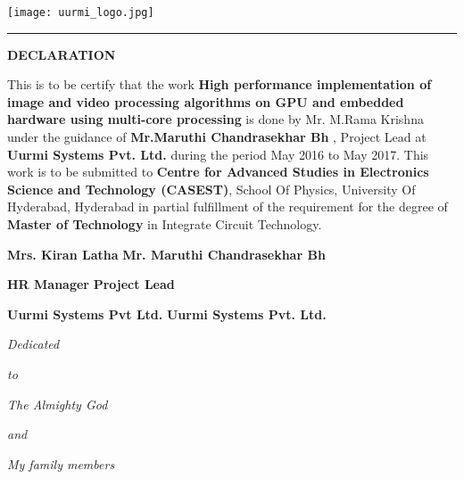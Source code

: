 \newpage
{\flushright
	\texttt{[image: uurmi\_logo.jpg]}\\
}
{\centering
\rule{\textwidth}{2pt}
\begin{center}
	\textbf{DECLARATION}
\end{center}}
This is to be certify that the work \textbf{High performance implementation of image and video processing algorithms on GPU and embedded hardware using multi-core processing} is done by
Mr. M.Rama Krishna under the guidance of \textbf{Mr.Maruthi Chandrasekhar Bh} , Project Lead
at \textbf{Uurmi Systems Pvt. Ltd.} during the period May 2016 to May 2017. This work
is to be submitted to \textbf{Centre for Advanced Studies in Electronics Science and
Technology (CASEST)}, School Of Physics, University Of Hyderabad, Hyderabad
in partial fulfillment of the requirement for the degree of \textbf{Master of Technology} in
Integrate Circuit Technology.\\
\vspace{5cm}
\par
\textbf{Mrs. Kiran Latha }          \hfill     \textbf{Mr. Maruthi Chandrasekhar Bh}\par
\textbf{HR Manager }                \hspace{3.2cm}     \textbf{Project Lead}\par
\textbf{Uurmi Systems Pvt Ltd.  }    \hspace{0.7cm}    \textbf{Uurmi Systems Pvt. Ltd.}\par


{\large \centering
\newpage
\null\vspace{8cm}
\textit{Dedicated}\par 
\textit{to} \par
\textit{The Almighty God} \par
\textit{and} \par
\textit{My family members}\par}
